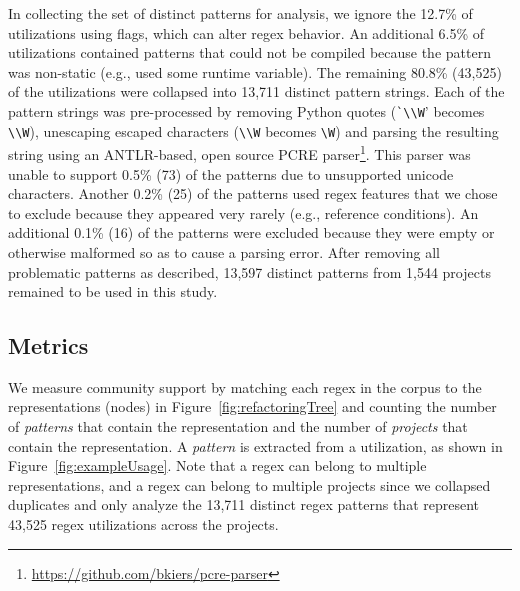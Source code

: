 In collecting the set of distinct patterns for analysis,  we ignore the 12.7\%  of utilizations using flags, which can alter regex behavior.  An additional 6.5\% of utilizations contained patterns that could not be compiled because the pattern was non-static (e.g., used some runtime variable).
The remaining 80.8\% (43,525) of the utilizations were collapsed into 13,711 distinct pattern strings.  Each of the pattern strings was pre-processed by removing Python quotes (\verb!`\\W!' becomes \verb!\\W!), unescaping escaped characters (\verb!\\W! becomes \verb!\W!) and parsing the resulting  string using an ANTLR-based, open source PCRE parser\footnote{\url{https://github.com/bkiers/pcre-parser}}.
This parser was unable to support 0.5\% (73) of the patterns due to unsupported unicode characters.  Another 0.2\% (25) of the patterns used regex features that we  chose to exclude because they appeared very rarely (e.g., reference conditions).  An additional 0.1\% (16) of the patterns were excluded because they were empty or otherwise malformed so as to cause a parsing error.  After removing all problematic patterns as described, 13,597 distinct patterns from 1,544 projects remained to be used in this study.



\subsection{Metrics}
\label{sec:communitymetric}
We measure community support by matching each regex in the corpus to the representations (nodes) in Figure~\ref{fig:refactoringTree} and counting the number of \emph{patterns} that contain the representation and the number of \emph{projects} that contain the representation.
A \emph{pattern} is extracted from a utilization, as shown in Figure~\ref{fig:exampleUsage}.
Note that a regex can belong to multiple representations, and a regex can belong to multiple projects since we collapsed duplicates and only analyze the 13,711 distinct regex patterns that represent 43,525 regex utilizations across the projects.
%
%



